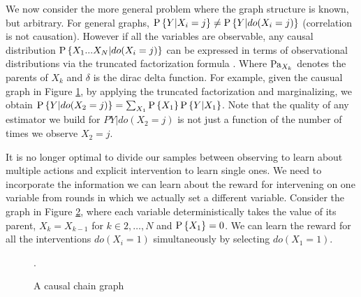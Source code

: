
\newcommand{\calP}{\mathcal P}
\newcommand{\x}{\boldsymbol{x}}
\newcommand{\Ps}{\operatorname{P}}

We now consider the more general problem where the graph structure is known, but arbitrary. For general graphs, $\P{Y|X_i=j} \neq \P{Y|do(X_i=j)}$ (correlation is not causation). However if all the variables are observable, any causal distribution $\P{X_1...X_N|do(X_i=j)}$ can be expressed in terms of observational distributions via the truncated factorization formula \cite{Pearl2000}. 
Where $\parents{X_k}$ denotes the parents of $X_k$ and $\delta$ is the dirac delta function. For example, given the causual graph in Figure \ref{fig:causalStructure_confounded}, by applying the truncated factorization and marginalizing, we obtain $\P{Y|do(X_2= j)} = \sum_{X_1}\P{X_1}\P{Y|X_1}$.  Note that the quality of any estimator we build for $P{Y|do(X_2= j)}$ is not just a function of the number of times we observe $X_2 = j$.

\begin{figure}[h]
\centering
{}
\caption{}\label{fig:causalStructure_confounded}
\end{figure} 

It is no longer optimal to divide our samples between observing to learn about multiple actions and explicit intervention to learn single ones. We need to incorporate the information we can learn about the reward for intervening on one variable from rounds in which we actually set a different variable.
Consider the graph in Figure \ref{fig:causalchain}, where each variable deterministically takes the value of its parent, $X_k = X_{k-1}$ 
for $k\in {2,\ldots,N}$ and $\P{X_1} = 0$. 
We can learn the reward for all the interventions $do(X_i = 1)$ simultaneously by selecting $do(X_1 = 1)$. 

\begin{figure}[h]
\centering
{}
\caption{A causal chain graph}.
\label{fig:causalchain}
\end{figure} 


